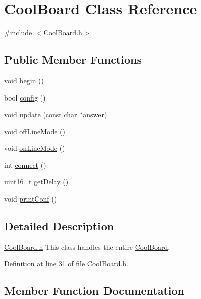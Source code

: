 \hypertarget{class_cool_board}{}\section{Cool\+Board Class Reference}
\label{class_cool_board}


{\ttfamily \#include $<$Cool\+Board.\+h$>$}

\subsection*{Public Member Functions}
\begin{DoxyCompactItemize}
\item 
void \hyperlink{class_cool_board_acba7c5aef7268b2c0044bdb54d3b9d76}{begin} ()
\item 
bool \hyperlink{class_cool_board_a583a874c09c07e70a6eb9229fc4beddb}{config} ()
\item 
void \hyperlink{class_cool_board_a8612756d3f73198cdde857a66f0fe690}{update} (const char $\ast$answer)
\item 
void \hyperlink{class_cool_board_ae6b5e1274d760462290192acea4adca8}{off\+Line\+Mode} ()
\item 
void \hyperlink{class_cool_board_aa0bbc4bc605e35618d18e68795c61363}{on\+Line\+Mode} ()
\item 
int \hyperlink{class_cool_board_a519de78b807f8ec6463ff484eb925918}{connect} ()
\item 
uint16\+\_\+t \hyperlink{class_cool_board_a12c3b5fa0ee6cc2c7d397abfc78f0f43}{get\+Delay} ()
\item 
void \hyperlink{class_cool_board_a486507b8f0981d3cc671ed31c2145755}{print\+Conf} ()
\end{DoxyCompactItemize}


\subsection{Detailed Description}
\hyperlink{_cool_board_8h}{Cool\+Board.\+h} This class handles the entire \hyperlink{class_cool_board}{Cool\+Board}. 

Definition at line 31 of file Cool\+Board.\+h.



\subsection{Member Function Documentation}
\mbox{\label{class_cool_board_acba7c5aef7268b2c0044bdb54d3b9d76}} 
